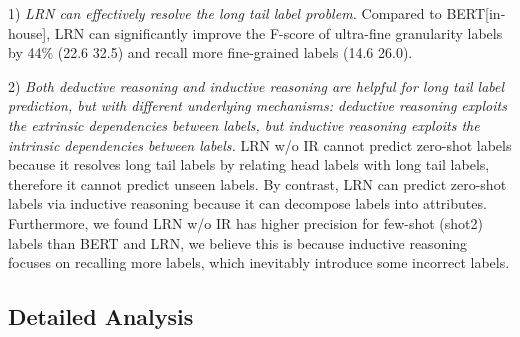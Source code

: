 \documentclass[11pt]{article}
\begin{document}
1) \textit{LRN can effectively resolve the long tail label problem.} Compared to BERT[in-house], LRN can significantly improve the F-score of ultra-fine granularity labels by 44\% (22.6  32.5) and recall more fine-grained labels (14.6  26.0).

2) \textit{Both deductive reasoning and inductive reasoning are helpful for long tail label prediction, but with different underlying mechanisms: deductive reasoning exploits the extrinsic dependencies between labels, but inductive reasoning exploits the intrinsic dependencies between labels.} LRN \small w/o IR \normalsize cannot predict zero-shot labels because it resolves long tail labels by relating head labels with long tail labels, therefore it cannot predict unseen labels. By contrast, LRN can predict zero-shot labels via inductive reasoning because it can decompose labels into attributes. Furthermore, we found LRN \small w/o IR \normalsize has higher precision for few-shot (shot2) labels than BERT and LRN, we believe this is because inductive reasoning focuses on recalling more labels, which inevitably introduce some incorrect labels.
\subsection{Detailed Analysis}
\end{document}
